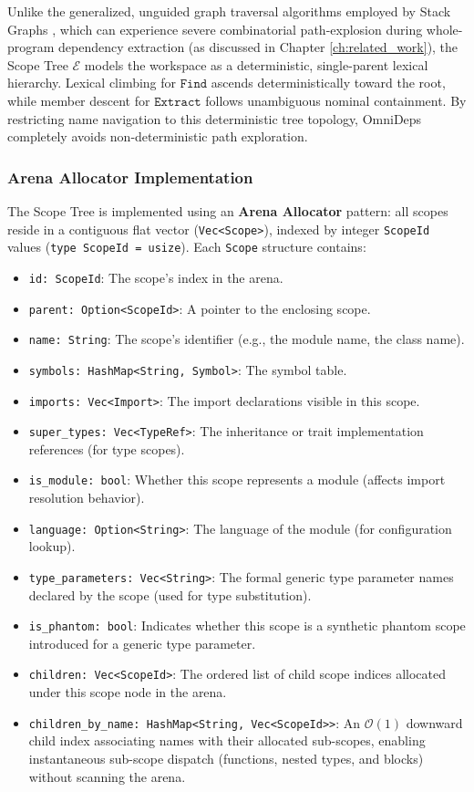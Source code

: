 Unlike the generalized, unguided graph traversal algorithms employed by
Stack Graphs \cite{creager_stack_2023}, which can experience severe
combinatorial path-explosion during whole-program dependency extraction
(as discussed in Chapter \ref{ch:related_work}), the Scope Tree $\mathcal{E}$
models the workspace as a deterministic, single-parent lexical hierarchy.
Lexical climbing for $\texttt{Find}$ ascends deterministically toward the root,
while member descent for $\texttt{Extract}$ follows unambiguous nominal
containment. By restricting name navigation to this deterministic tree
topology, OmniDeps completely avoids non-deterministic path exploration.

\subsubsection{Arena Allocator Implementation}

The Scope Tree is implemented using an \textbf{Arena Allocator}
pattern: all scopes reside in a contiguous flat vector
(\texttt{Vec<Scope>}), indexed by integer \texttt{ScopeId} values
(\texttt{type ScopeId = usize}). Each \texttt{Scope} structure contains:

\begin{itemize}
  \item \texttt{id: ScopeId}: The scope's index in the arena.
  \item \texttt{parent: Option<ScopeId>}: A pointer to the enclosing scope.
  \item \texttt{name: String}: The scope's identifier (e.g., the
    module name, the class name).
  \item \texttt{symbols: HashMap<String, Symbol>}: The symbol table.
  \item \texttt{imports: Vec<Import>}: The import declarations
    visible in this scope.
  \item \texttt{super\_types: Vec<TypeRef>}: The inheritance or trait
    implementation references (for type scopes).
  \item \texttt{is\_module: bool}: Whether this scope represents a
    module (affects import resolution behavior).
  \item \texttt{language: Option<String>}: The language of the module
    (for configuration lookup).
  \item \texttt{type\_parameters: Vec<String>}: The formal generic
    type parameter
    names declared by the scope (used for type substitution).
  \item \texttt{is\_phantom: bool}: Indicates whether this scope is a synthetic
    phantom scope introduced for a generic type parameter.
  \item \texttt{children: Vec<ScopeId>}: The ordered list of child scope indices
    allocated under this scope node in the arena.
  \item \texttt{children\_by\_name: HashMap<String, Vec<ScopeId>>}:
    An $\mathcal{O}(1)$
    downward child index associating names with their allocated sub-scopes,
    enabling instantaneous sub-scope dispatch (functions, nested
    types, and blocks)
    without scanning the arena.
\end{itemize}


